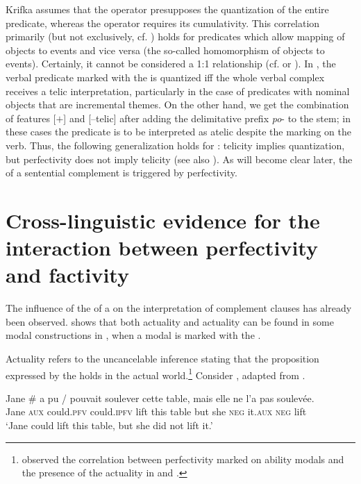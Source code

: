 \documentclass[output=paper,  modfonts,  newtxmath,  hidelinks		  ]{langscibook}
\begin{document}
Krifka assumes that the  operator presupposes the quantization of the entire predicate, whereas the  operator requires its cumulativity. This correlation primarily (but not exclusively, cf. \citealt{Krifka1998}) holds for predicates which allow mapping of objects to events and vice versa (the so-called homomorphism of objects to events). Certainly, it cannot be considered a 1:1 relationship (cf. \citealt{Filip1996,Filip2005} or \citealt{Borik2006}). In , the verbal predicate marked with the  is quantized iff the whole verbal complex receives a telic interpretation, particularly in the case of predicates with nominal objects that are incremental themes. On the other hand, we get the combination of features [$+$] and [$–$telic] after adding the delimitative prefix \textit{po}- to the  stem; in these cases the predicate is to be interpreted as atelic despite the  marking on the verb. Thus, the following generalization holds for : telicity implies quantization, but perfectivity does not imply telicity (see also \citealt{Gehrke2008}). As will become clear later, the  of a sentential complement is triggered by perfectivity.

\section{Cross-linguistic evidence for the interaction between perfectivity and factivity}

The influence of the  of a  on the  interpretation of complement clauses has already been observed. \cite{Hacquard2006} shows that both actuality  and actuality  can be found in some modal constructions in , when a modal is marked with the .\par Actuality  refers to the uncancelable inference stating that the proposition expressed by the  holds in the actual world.\footnote{\cite{Bhatt1999} observed the correlation between perfectivity marked on ability modals and the presence of the actuality  in  and .} Consider , adapted from \cite[21]{Hacquard2006}.

\ea\label{21:10}
\gll Jane {\#}\hspace{-2pt} a pu / pouvait soulever cette table, mais elle ne l’a pas soulevée. \\
    Jane {} \textsc{aux} could.\textsc{pfv} {} could.\textsc{ipfv} lift this table but she \textsc{neg} it.\textsc{aux} \textsc{neg} lift\\
\glt	`Jane could lift this table, but she did not lift it.'
\z
\end{document}
